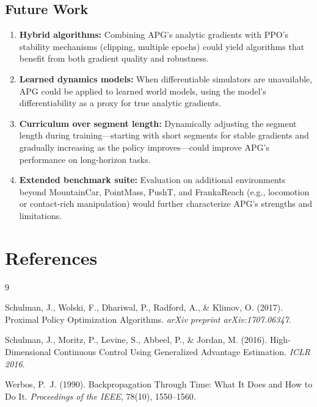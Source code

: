 \documentclass[11pt,a4paper]{article}
\begin{document}
\subsection{Future Work}
\label{sec:future}

\begin{enumerate}
  \item \textbf{Hybrid algorithms:} Combining APG's analytic gradients with PPO's stability mechanisms (clipping, multiple epochs) could yield algorithms that benefit from both gradient quality and robustness.

  \item \textbf{Learned dynamics models:} When differentiable simulators are unavailable, APG could be applied to learned world models, using the model's differentiability as a proxy for true analytic gradients.

  \item \textbf{Curriculum over segment length:} Dynamically adjusting the segment length during training---starting with short segments for stable gradients and gradually increasing as the policy improves---could improve APG's performance on long-horizon tasks.

  \item \textbf{Extended benchmark suite:} Evaluation on additional environments beyond MountainCar, PointMass, PushT, and FrankaReach (e.g., locomotion or contact-rich manipulation) would further characterize APG's strengths and limitations.
\end{enumerate}

\section*{References}
\label{sec:references}

\begin{thebibliography}{9}

  Schulman, J., Wolski, F., Dhariwal, P., Radford, A., \& Klimov, O. (2017).
  Proximal Policy Optimization Algorithms.
  \textit{arXiv preprint arXiv:1707.06347}.

  Schulman, J., Moritz, P., Levine, S., Abbeel, P., \& Jordan, M. (2016).
  High-Dimensional Continuous Control Using Generalized Advantage Estimation.
  \textit{ICLR 2016}.

  Werbos, P.~J. (1990).
  Backpropagation Through Time: What It Does and How to Do It.
  \textit{Proceedings of the IEEE}, 78(10), 1550--1560.

\end{thebibliography}
\end{document}

